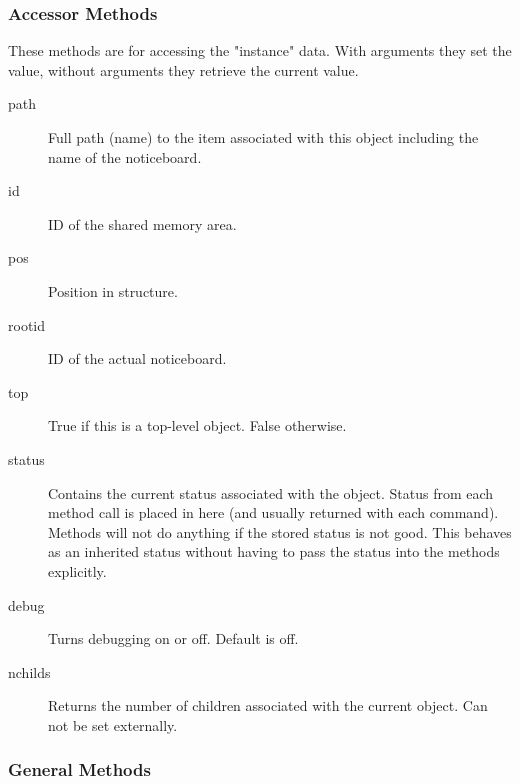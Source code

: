 \documentclass[twoside,11pt]{article}
\renewcommand{\_}{\texttt{\symbol{95}}}
\begin{document}
\subsubsection*{Accessor Methods}

These methods are for accessing the "instance" data.
With arguments they set the value, without arguments they
retrieve the current value.

\begin{description}

\item[path] \mbox{}

Full path (name) to the item associated with this object
including the name of the noticeboard.

\item[id] \mbox{}

ID of the shared memory area.

\item[pos] \mbox{}


Position in structure.

\item[rootid] \mbox{}

ID of the actual noticeboard.

\item[top] \mbox{}

True if this is a top-level object. False otherwise.

\item[status] \mbox{}

Contains the current status associated with the object. Status from
each method call is placed in here (and usually returned with each
command). Methods will not do anything if the stored status is not
good. This behaves as an inherited status without having to pass
the status into the methods explicitly.

\item[debug] \mbox{}

Turns debugging on or off. Default is off.

\item[nchilds] \mbox{}

Returns the number of children associated with the current object.
Can not be set externally.

\end{description}

\subsubsection*{General Methods}%
\end{document}
